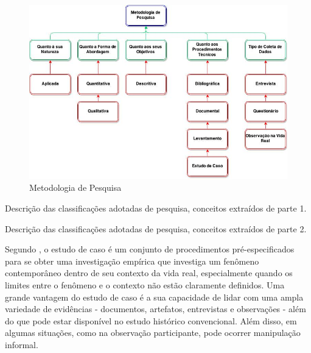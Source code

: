 \begin{figure}[h!]
\centering
\includegraphics[keepaspectratio=false,scale=0.55]{figuras/figuras_nilton/selecaoMetodologica.png}
\caption{Metodologia de Pesquisa}
\label{7eixosqualidade}
\end{figure}

\begin{table}[!ht]
	\begin{center}
	
	 
	\caption{Descrição das classificações adotadas de pesquisa, conceitos extraídos de   parte 1.}
	\label{tab:descricaoMetodologia}
	\end{center}
	\end{table}	
	\FloatBarrier
	
	
	
	\begin{table}[!ht]
	\begin{center}
	
	 
	\caption{Descrição das classificações adotadas de pesquisa, conceitos extraídos de   parte 2.}
	\label{tab:descricaoMetodologia2}
	\end{center}
	\end{table}	
	\FloatBarrier

Segundo \cite{yin2001estudo}, o estudo de caso é um conjunto de procedimentos pré-especificados para se obter uma investigação empírica que investiga um fenômeno contemporâneo dentro de seu contexto da vida real, especialmente quando os limites entre o fenômeno e o contexto não estão claramente definidos. Uma grande vantagem do estudo de caso é a sua capacidade de lidar com uma ampla variedade de evidências - documentos, artefatos, entrevistas e observações - além do que pode estar disponível no estudo histórico convencional. Além disso, em algumas situações, como na observação participante, pode ocorrer manipulação informal.


